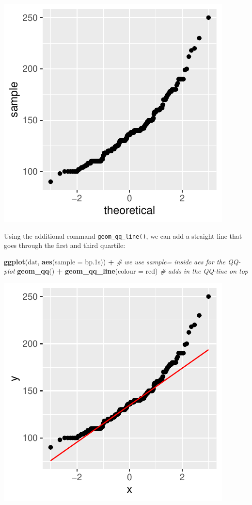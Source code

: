\documentclass[
]{book}
\newenvironment{Shaded}{\begin{snugshade}}{\end{snugshade}}
\newcommand{\AttributeTok}[1]{\textcolor[rgb]{0.13,0.29,0.53}{#1}}
\newcommand{\CommentTok}[1]{\textcolor[rgb]{0.56,0.35,0.01}{\textit{#1}}}
\newcommand{\FloatTok}[1]{\textcolor[rgb]{0.00,0.00,0.81}{#1}}
\newcommand{\FunctionTok}[1]{\textcolor[rgb]{0.13,0.29,0.53}{\textbf{#1}}}
\newcommand{\NormalTok}[1]{#1}
\newcommand{\SpecialCharTok}[1]{\textcolor[rgb]{0.81,0.36,0.00}{\textbf{#1}}}
\newcommand{\StringTok}[1]{\textcolor[rgb]{0.31,0.60,0.02}{#1}}
\begin{document}
\includegraphics{_main_files/figure-latex/unnamed-chunk-51-1.pdf}

Using the additional command \texttt{geom\_qq\_line()}, we can add a straight line that goes through the first and third quartile:

\begin{Shaded}
\begin{Highlighting}[]
\FunctionTok{ggplot}\NormalTok{(dat,}
       \FunctionTok{aes}\NormalTok{(}\AttributeTok{sample =}\NormalTok{ bp}\FloatTok{.1}\NormalTok{s)) }\SpecialCharTok{+}     \CommentTok{\# we use sample= inside aes for the QQ{-}plot}
  \FunctionTok{geom\_qq}\NormalTok{() }\SpecialCharTok{+}
  \FunctionTok{geom\_qq\_line}\NormalTok{(}\AttributeTok{colour =} \StringTok{\textquotesingle{}red\textquotesingle{}}\NormalTok{)                  }\CommentTok{\# adds in the QQ{-}line on top}
\end{Highlighting}
\end{Shaded}

\includegraphics{_main_files/figure-latex/unnamed-chunk-52-1.pdf}
\end{document}
